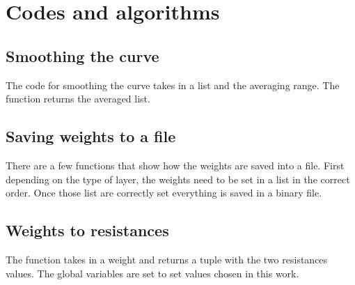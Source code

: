 \chapter{Codes and algorithms}
\label{ap:codes}
\clearpage
\pythonstyle

\section{Smoothing the curve}\label{apsec:smoothFunc}

The code for smoothing the curve takes in a list and the averaging range. The function returns the averaged list.



\section{Saving weights to a file}\label{apsec:saveWei}

There are a few functions that show how the weights are saved into a file.
First depending on the type of layer, the weights need to be set in a list in the correct order.
Once those list are correctly set everything is saved in a binary file.



\section{Weights to resistances}\label{apsec:wei2res}

The function takes in a weight and returns a tuple with the two resistances values. The global variables are set to set values chosen in this work.


